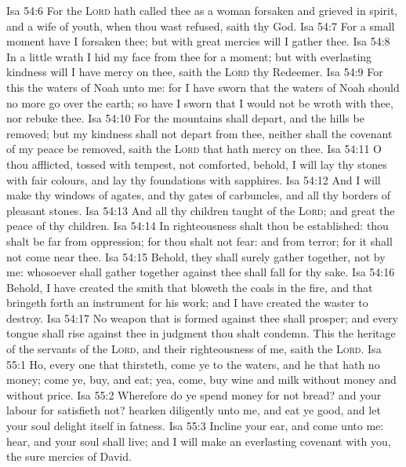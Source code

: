\vs Isa 54:6 For the \textsc{Lord} hath called thee as a woman forsaken and grieved in spirit, and a wife of youth, when thou wast refused, saith thy God.
\vs Isa 54:7 For a small moment have I forsaken thee; but with great mercies will I gather thee.
\vs Isa 54:8 In a little wrath I hid my face from thee for a moment; but with everlasting kindness will I have mercy on thee, saith the \textsc{Lord} thy Redeemer.
\vs Isa 54:9 For this  the waters of Noah unto me: for  I have sworn that the waters of Noah should no more go over the earth; so have I sworn that I would not be wroth with thee, nor rebuke thee.
\vs Isa 54:10 For the mountains shall depart, and the hills be removed; but my kindness shall not depart from thee, neither shall the covenant of my peace be removed, saith the \textsc{Lord} that hath mercy on thee.
\vs Isa 54:11 O thou afflicted, tossed with tempest,  not comforted, behold, I will lay thy stones with fair colours, and lay thy foundations with sapphires.
\vs Isa 54:12 And I will make thy windows of agates, and thy gates of carbuncles, and all thy borders of pleasant stones.
\vs Isa 54:13 And all thy children  taught of the \textsc{Lord}; and great  the peace of thy children.
\vs Isa 54:14 In righteousness shalt thou be established: thou shalt be far from oppression; for thou shalt not fear: and from terror; for it shall not come near thee.
\vs Isa 54:15 Behold, they shall surely gather together,  not by me: whosoever shall gather together against thee shall fall for thy sake.
\vs Isa 54:16 Behold, I have created the smith that bloweth the coals in the fire, and that bringeth forth an instrument for his work; and I have created the waster to destroy.
\vs Isa 54:17 No weapon that is formed against thee shall prosper; and every tongue  shall rise against thee in judgment thou shalt condemn. This  the heritage of the servants of the \textsc{Lord}, and their righteousness  of me, saith the \textsc{Lord}.
\vs Isa 55:1 Ho, every one that thirsteth, come ye to the waters, and he that hath no money; come ye, buy, and eat; yea, come, buy wine and milk without money and without price.
\vs Isa 55:2 Wherefore do ye spend money for  not bread? and your labour for  satisfieth not? hearken diligently unto me, and eat ye  good, and let your soul delight itself in fatness.
\vs Isa 55:3 Incline your ear, and come unto me: hear, and your soul shall live; and I will make an everlasting covenant with you,  the sure mercies of David.
